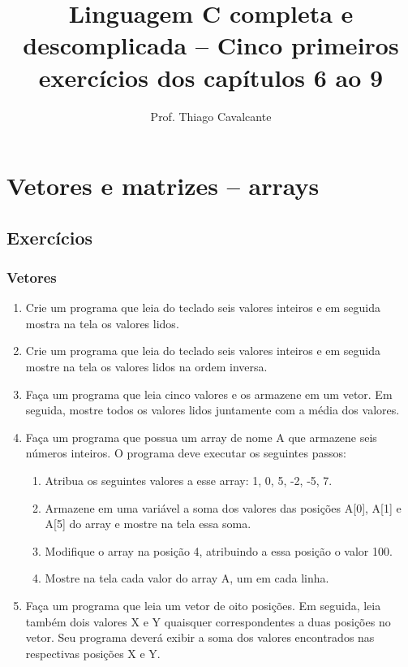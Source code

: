 \documentclass[a4paper,12pt]{article}
\title{Linguagem C completa e descomplicada -- Cinco primeiros exercícios dos capítulos 6 ao 9}
\author{Prof. Thiago Cavalcante}
\date{}
\begin{document}
\maketitle

\setcounter{section}{5}
\section{Vetores e matrizes – arrays}

\setcounter{subsection}{6}
\subsection{Exercícios}

\subsubsection{Vetores}

\begin{enumerate}
  \item Crie um programa que leia do teclado seis valores inteiros e em seguida mostra na tela os valores lidos.
  \item Crie um programa que leia do teclado seis valores inteiros e em seguida mostre na tela os valores lidos na ordem inversa.
  \item Faça um programa que leia cinco valores e os armazene em um vetor. Em seguida, mostre todos os valores lidos juntamente com a média dos valores.
  \item Faça um programa que possua um array de nome A que armazene seis números inteiros. O programa deve executar os seguintes passos:

  \begin{enumerate}
    \item Atribua os seguintes valores a esse array: 1, 0, 5, -2, -5, 7.
    \item Armazene em uma variável a soma dos valores das posições A[0], A[1] e A[5] do array e mostre na tela essa soma.
    \item Modifique o array na posição 4, atribuindo a essa posição o valor 100.
    \item Mostre na tela cada valor do array A, um em cada linha.
  \end{enumerate}

  \item Faça um programa que leia um vetor de oito posições. Em seguida, leia também dois valores X e Y quaisquer correspondentes a duas posições no vetor. Seu programa deverá exibir a soma dos valores encontrados nas respectivas posições X e Y.
\end{enumerate}
\end{document}

